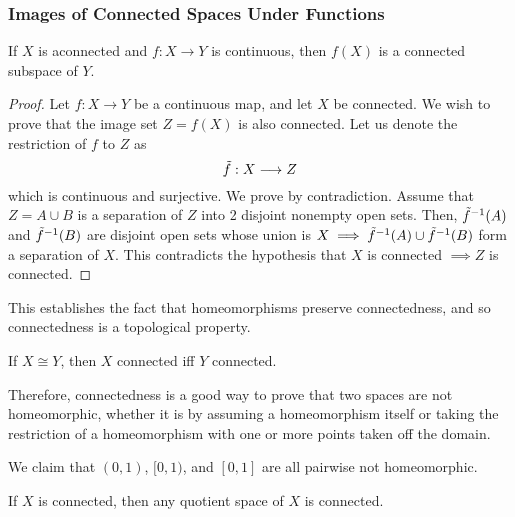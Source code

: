\subsubsection{Images of Connected Spaces Under Functions}

  \begin{theorem}
    If $X$ is aconnected and $f: X \rightarrow Y$ is continuous, then $f(X)$ is a connected subspace of $Y$. 
  \end{theorem}
  \begin{proof}
    Let $f: X \longrightarrow Y$ be a continuous map, and let $X$ be connected. We wish to prove that the image set $Z = f(X)$ is also connected. Let us denote the restriction of $f$ to $Z$ as
    \begin{equation}
      \Tilde{f}: X \longrightarrow Z
    \end{equation}
    which is continuous and surjective. We prove by contradiction. Assume that $Z = A \cup B$ is a separation of $Z$ into 2 disjoint nonempty open sets. Then, $\Tilde{f}^{-1} (A)$ and $\Tilde{f}^{-1}(B)$ are disjoint open sets whose union is $X \implies \Tilde{f}^{-1} (A) \cup \Tilde{f}^{-1}(B)$ form a separation of $X$. This contradicts the hypothesis that $X$ is connected $\implies Z$ is connected.  
  \end{proof} 

  This establishes the fact that homeomorphisms preserve connectedness, and so connectedness is a topological property.  

  \begin{corollary}
    If $X \cong Y$, then $X$ connected iff $Y$ connected. 
  \end{corollary}

  Therefore, connectedness is a good way to prove that two spaces are not homeomorphic, whether it is by assuming a homeomorphism itself or taking the restriction of a homeomorphism with one or more points taken off the domain. 

  \begin{example}
    We claim that $(0, 1)$, $[0, 1)$, and $[0, 1]$ are all pairwise not homeomorphic. 
  \end{example}

  \begin{corollary}
    If $X$ is connected, then any quotient space of $X$ is connected. 
  \end{corollary}

